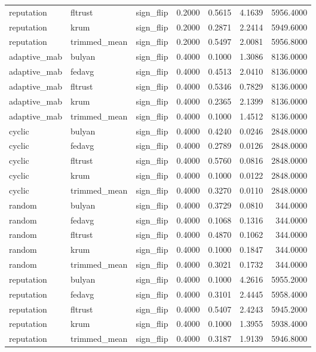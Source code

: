 \begin{tabular}{lllrrrr}
reputation & fltrust & sign_flip & 0.2000 & 0.5615 & 4.1639 & 5956.4000 \\
reputation & krum & sign_flip & 0.2000 & 0.2871 & 2.2414 & 5949.6000 \\
reputation & trimmed_mean & sign_flip & 0.2000 & 0.5497 & 2.0081 & 5956.8000 \\
adaptive_mab & bulyan & sign_flip & 0.4000 & 0.1000 & 1.3086 & 8136.0000 \\
adaptive_mab & fedavg & sign_flip & 0.4000 & 0.4513 & 2.0410 & 8136.0000 \\
adaptive_mab & fltrust & sign_flip & 0.4000 & 0.5346 & 0.7829 & 8136.0000 \\
adaptive_mab & krum & sign_flip & 0.4000 & 0.2365 & 2.1399 & 8136.0000 \\
adaptive_mab & trimmed_mean & sign_flip & 0.4000 & 0.1000 & 1.4512 & 8136.0000 \\
cyclic & bulyan & sign_flip & 0.4000 & 0.4240 & 0.0246 & 2848.0000 \\
cyclic & fedavg & sign_flip & 0.4000 & 0.2789 & 0.0126 & 2848.0000 \\
cyclic & fltrust & sign_flip & 0.4000 & 0.5760 & 0.0816 & 2848.0000 \\
cyclic & krum & sign_flip & 0.4000 & 0.1000 & 0.0122 & 2848.0000 \\
cyclic & trimmed_mean & sign_flip & 0.4000 & 0.3270 & 0.0110 & 2848.0000 \\
random & bulyan & sign_flip & 0.4000 & 0.3729 & 0.0810 & 344.0000 \\
random & fedavg & sign_flip & 0.4000 & 0.1068 & 0.1316 & 344.0000 \\
random & fltrust & sign_flip & 0.4000 & 0.4870 & 0.1062 & 344.0000 \\
random & krum & sign_flip & 0.4000 & 0.1000 & 0.1847 & 344.0000 \\
random & trimmed_mean & sign_flip & 0.4000 & 0.3021 & 0.1732 & 344.0000 \\
reputation & bulyan & sign_flip & 0.4000 & 0.1000 & 4.2616 & 5955.2000 \\
reputation & fedavg & sign_flip & 0.4000 & 0.3101 & 2.4445 & 5958.4000 \\
reputation & fltrust & sign_flip & 0.4000 & 0.5407 & 2.4243 & 5945.2000 \\
reputation & krum & sign_flip & 0.4000 & 0.1000 & 1.3955 & 5938.4000 \\
reputation & trimmed_mean & sign_flip & 0.4000 & 0.3187 & 1.9139 & 5946.8000 \\
\bottomrule
\end{tabular}
